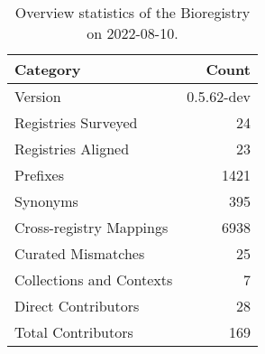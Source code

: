 \begin{table}
\centering
\caption{Overview statistics of the Bioregistry on 2022-08-10.}
\label{tab:bioregistry-summary}
\begin{tabular}{lr}
\toprule
                Category &      Count \\
\midrule
                 Version & 0.5.62-dev \\
     Registries Surveyed &         24 \\
      Registries Aligned &         23 \\
                Prefixes &       1421 \\
                Synonyms &        395 \\
 Cross-registry Mappings &       6938 \\
      Curated Mismatches &         25 \\
Collections and Contexts &          7 \\
     Direct Contributors &         28 \\
      Total Contributors &        169 \\
\bottomrule
\end{tabular}
\end{table}
